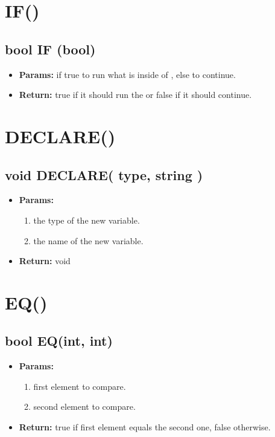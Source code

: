 \documentclass[11pt,a4paper]{article}
\begin{document}
\section*{IF(){}}
\begin{framed}
\subsection*{bool IF (bool)}
\begin{itemize}
\item \textbf{Params:} if true to run what is inside of {}, else to continue.
\item \textbf{Return:} true if it should run the {} or false if it should continue.
\end{itemize}
\end{framed}

\section*{DECLARE()}
\begin{framed}
\subsection*{void DECLARE( type, string )}
\begin{itemize}
\item \textbf{Params:}
\begin{enumerate}
\item the type of the new variable.
\item the name of the new variable.
\end{enumerate}
\item \textbf{Return:} void
\end{itemize}
\end{framed}

\section*{EQ()}
\begin{framed}
\subsection*{bool EQ(int, int)}
\begin{itemize}
\item \textbf{Params:}
\begin{enumerate}
\item first element to compare.
\item second element to compare.
\end{enumerate}
\item \textbf{Return:} true if first element equals the second one, false otherwise.
\end{itemize}
\end{framed}
\end{document}
